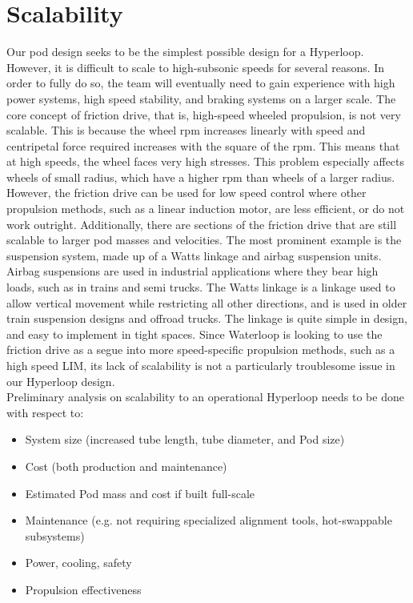 \documentclass[main.tex]{subfiles}
\begin{document}
\section{Scalability}
Our pod design seeks to be the simplest possible design for a Hyperloop. However, it is difficult to scale to high-subsonic speeds for several reasons.
In order to fully do so, the team will eventually need to gain experience with high power systems, high speed stability, and braking systems on a larger scale. The core concept of friction drive, that is, high-speed wheeled propulsion, is not very scalable. This is because the wheel rpm increases linearly with speed and centripetal force required increases with the square of the rpm. This means that at high speeds, the wheel faces very high stresses. This problem especially affects wheels of small radius, which have a higher rpm than wheels of a larger radius. However, the friction drive can be used for low speed control where other propulsion methods, such as a linear induction motor, are less efficient, or do not work outright. Additionally, there are sections of the friction drive that are still scalable to larger pod masses and velocities. The most prominent example is the suspension system, made up of a Watts linkage and airbag suspension units. Airbag suspensions are used in industrial applications where they bear high loads, such as in trains and semi trucks. The Watts linkage is a linkage used to allow vertical movement while restricting all other directions, and is used in older train suspension designs and offroad trucks. The linkage is quite simple in design, and easy to implement in tight spaces. Since Waterloop is looking to use the friction drive as a segue into more speed-specific propulsion methods, such as a high speed LIM, its lack of scalability is not a particularly troublesome issue in our Hyperloop design.\\
Preliminary analysis on scalability to an operational Hyperloop needs to be done with respect to:
\begin{itemize}
    \item System size (increased tube length, tube diameter, and Pod size)

    \item Cost (both production and maintenance)
    \item Estimated Pod mass and cost if built full-scale
    \item Maintenance (e.g. not requiring specialized alignment tools, hot-swappable subsystems)
    \item Power, cooling, safety
    \item Propulsion effectiveness
\end{itemize}
\end{document}
